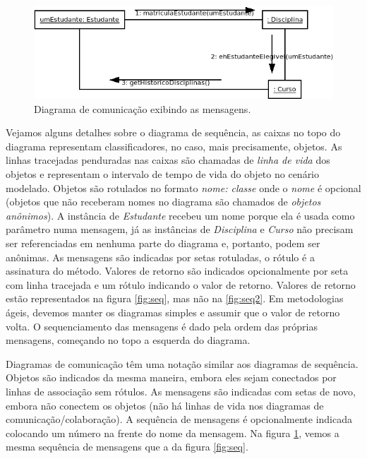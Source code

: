 \begin{figure}[h]
\begin{center}
\includegraphics[scale=0.6]{clsComm.png}
\end{center}
\caption{Diagrama de comunicação exibindo as mensagens.} \label{fig:comm}
\end{figure}

Vejamos alguns detalhes sobre o diagrama de sequência, as caixas no topo do diagrama representam classificadores, no caso, mais precisamente, objetos. As linhas tracejadas penduradas nas caixas são chamadas de \textit{linha de vida} dos objetos e representam o intervalo de tempo de vida do objeto no cenário modelado. Objetos são rotulados no formato \emph{nome: classe} onde o \emph{nome} é opcional (objetos que não receberam nomes no diagrama são chamados de \textit{objetos anônimos}). A instância de \emph{Estudante} recebeu um nome porque ela é usada como parâmetro numa mensagem, já as instâncias de \emph{Disciplina} e \emph{Curso} não precisam ser referenciadas em nenhuma parte do diagrama e, portanto, podem ser anônimas. As  mensagens são indicadas por setas rotuladas, o rótulo é a assinatura do método. Valores de retorno são indicados opcionalmente por seta com linha tracejada e um rótulo indicando o valor de retorno. Valores de retorno estão representados na figura \ref{fig:seq}, mas não na \ref{fig:seq2}. Em metodologias ágeis, devemos manter os diagramas simples e assumir que o valor de retorno volta. O sequenciamento das mensagens é dado pela ordem das próprias mensagens, começando no topo a esquerda do diagrama.

Diagramas de comunicação têm uma notação similar aos diagramas de sequência. Objetos são indicados da mesma maneira, embora eles sejam conectados por linhas de associação sem rótulos. As mensagens são indicadas com setas de novo, embora não conectem os objetos (não há linhas de vida nos diagramas de comunicação/colaboração). A sequência de mensagens é opcionalmente indicada colocando um número na frente do nome da mensagem. Na figura \ref{fig:comm}, vemos a mesma sequência de mensagens que a da figura \ref{fig:seq}.


